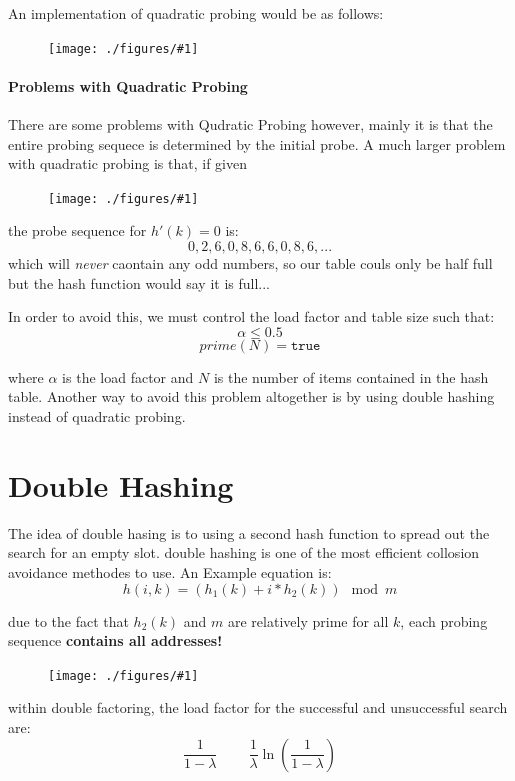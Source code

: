 \documentclass[12pt]{book}
\newcommand{\incimg}[2]{%
       \begin{figure}[h]
               \centering
               \texttt{[image: ./figures/\#1]}
       \end{figure}
}
\begin{document}
An implementation of quadratic probing would be as follows:
\incimg{code}{0.5}

\paragraph{Problems with Quadratic Probing}
There are some problems with Qudratic Probing however, mainly it is that the entire probing sequece is determined by the initial probe.
A much larger problem with quadratic probing is that, if given
\incimg{probe}{0.5}
the probe sequence for $h'(k) = 0$ is:
\[0,2,6,0,8,6,6,0,8,6,...\]
which will \textit{never} caontain any odd numbers, so our table couls only be half full but the hash function would say it is full...

In order to avoid this, we must control the load factor and table size such that:
\[\alpha \leq 0.5\]
\[prime(N) = \texttt{true}\]

where $\alpha$ is the load factor and $N$ is the number of items contained in the hash table.
Another way to avoid this problem altogether is by using double hashing instead of quadratic probing.

\section*{Double Hashing}
The idea of double hasing is to using a second hash function to spread out the search for an empty slot. double hashing is one of the most efficient
collosion avoidance methodes to use. An Example equation is:
\[h(i, k) = (h_1(k) + i*h_2(k)) \mod m\]

due to the fact that $h_2(k)$ and $m$ are relatively prime for all $k$, each probing sequence \textbf{contains all addresses!}
\incimg{doublehash}{0.4}

within double factoring, the load factor for the successful and unsuccessful search are:
\[\frac{1}{1-\lambda}\;\;\;\;\;\;\;\;\frac{1}{\lambda}\ln\left(\frac{1}{1-\lambda}\right)\]
\end{document}
